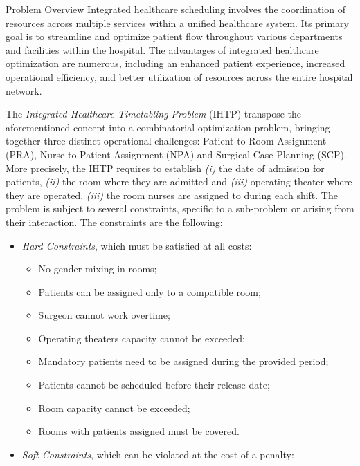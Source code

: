\begin{section}{Problem Overview}
 Integrated healthcare scheduling involves the coordination of resources
 across multiple services within a unified healthcare system. Its primary
 goal is to streamline and optimize patient flow throughout various departments
 and facilities within the hospital. The advantages of integrated healthcare
 optimization are numerous, including an enhanced patient experience, increased
 operational efficiency, and better utilization of resources across the entire
 hospital network.

 The \textit{Integrated Healthcare Timetabling Problem} (IHTP) \cite{ihtc2024} transpose the
 aforementioned concept into a combinatorial optimization problem, bringing together
 three distinct operational challenges:
 Patient-to-Room Assignment (PRA), Nurse-to-Patient Assignment (NPA)  and
 Surgical Case Planning (SCP).
 More precisely, the IHTP requires to establish \textit{(i)} the date of admission for patients,
 \textit{(ii)} the room where they are admitted and \textit{(iii)} operating theater where they are operated,
 \textit{(iii)} the room nurses are assigned to during each shift.
 The problem is subject to several constraints, specific to a sub-problem or arising from their interaction.
 The constraints are the following:
 \begin{itemize}
     \item \textit{Hard Constraints}, which must be satisfied at all costs:
           \begin{itemize}
               \item No gender mixing in rooms;
               \item Patients can be assigned only to a compatible room;
               \item Surgeon cannot work overtime;
               \item Operating theaters capacity cannot be exceeded;
               \item Mandatory patients need to be assigned during the provided period;
               \item Patients cannot be scheduled before their release date;
               \item Room capacity cannot be exceeded;
               \item Rooms with patients assigned must be covered.
           \end{itemize}
     \item \textit{Soft Constraints}, which can be violated at the cost of a penalty:

\end{itemize}
\end{section}
